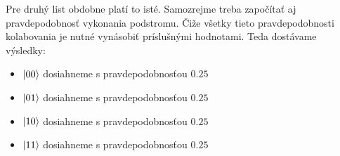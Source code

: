 Pre druhý list obdobne platí to isté. Samozrejme treba započítať aj
pravdepodobnosť vykonania podstromu. Čiže všetky tieto pravdepodobnosti
kolabovania je nutné vynásobiť príslušnými hodnotami. Teda dostávame výsledky:
\begin{itemize}
    \item \(\ket{00}\) dosiahneme s pravdepodobnosťou \(0.25\)
    \item \(\ket{01}\) dosiahneme s pravdepodobnosťou \(0.25\)
    \item \(\ket{10}\) dosiahneme s pravdepodobnosťou \(0.25\)
    \item \(\ket{11}\) dosiahneme s pravdepodobnosťou \(0.25\)
\end{itemize}
